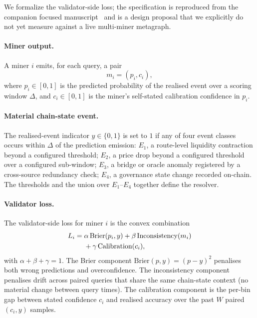 \documentclass[journal]{IEEEtran}
\begin{document}
We formalize the validator-side loss; the specification is reproduced
from the companion focused manuscript~\cite{magableh2026agenticiov}
and is a design proposal that we explicitly do not yet measure
against a live multi-miner metagraph.

\paragraph*{Miner output.}
A miner $i$ emits, for each query, a pair
\begin{equation}
m_i = (p_i, c_i),
\end{equation}
where $p_i \in [0,1]$ is the predicted probability of the realised
event over a scoring window $\Delta$, and $c_i \in [0,1]$ is the miner's
self-stated calibration confidence in $p_i$.

\paragraph*{Material chain-state event.}
The realised-event indicator $y \in \{0,1\}$ is set to $1$ if any of
four event classes occurs within $\Delta$ of the prediction emission:
$E_1$, a route-level liquidity contraction beyond a configured
threshold; $E_2$, a price drop beyond a configured threshold over a
configured sub-window; $E_3$, a bridge or oracle anomaly registered by
a cross-source redundancy check; $E_4$, a governance state change
recorded on-chain. The thresholds and the union over $E_1$--$E_4$
together define the resolver.

\paragraph*{Validator loss.}
The validator-side loss for miner $i$ is the convex combination
\begin{align}
L_i ={}& \alpha\,\mathrm{Brier}(p_i,y)
       + \beta\,\mathrm{Inconsistency}(m_i) \notag\\
      &+ \gamma\,\mathrm{Calibration}(c_i),
\end{align}
with $\alpha+\beta+\gamma = 1$.
The Brier component $\mathrm{Brier}(p,y) = (p-y)^2$ penalises both
wrong predictions and overconfidence. The inconsistency component
penalises drift across paired queries that share the same chain-state
context (no material change between query times). The calibration
component is the per-bin gap between stated confidence $c_i$ and
realised accuracy over the past $W$ paired $(c_i,y)$ samples.
\end{document}
